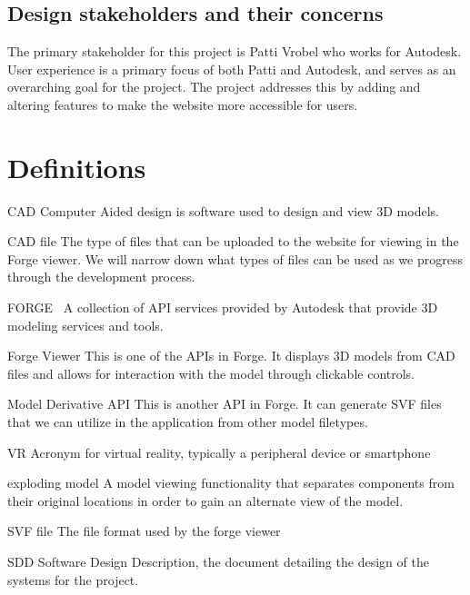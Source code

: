 \documentclass[letterpaper, 10pt, draftclsnofoot, compsoc, onecolumn]{IEEEtran}
\begin{document}
\subsection{Design stakeholders and their concerns}
	The primary stakeholder for this project is Patti Vrobel who works for Autodesk. User experience is a primary focus of both Patti and Autodesk, and serves as an overarching goal for the project. The project addresses this by adding and altering features to make the website more accessible for users.

%
%

\section{Definitions}
\begin{description}
	\item{CAD} Computer Aided design is software used to design and view 3D models.

	\item{CAD file} The type of files that can be uploaded to the website for viewing in the Forge viewer. 
	We will  narrow down what types of files can be used as we progress through the development process.

	\item{FORGE}~\cite{forge2016} A collection of API services provided by Autodesk that provide 3D modeling services and tools.

	\item{Forge Viewer} This is one of the APIs in Forge. It displays 3D models from CAD files and allows for interaction with the model through clickable controls.
	
	\item{Model Derivative API} This is another API in Forge. It can generate SVF files that we can utilize in the application from other model filetypes.
	
	\item{VR} Acronym for virtual reality, typically a peripheral device or smartphone

	\item{exploding model} A model viewing functionality that separates components from their original locations in order to gain an alternate view of the model.

	\item{SVF file} The file format used by the forge viewer
	
	\item{SDD} Software Design Description, the document detailing the design of the systems for the project.
	
\end{description} 
\end{document}
